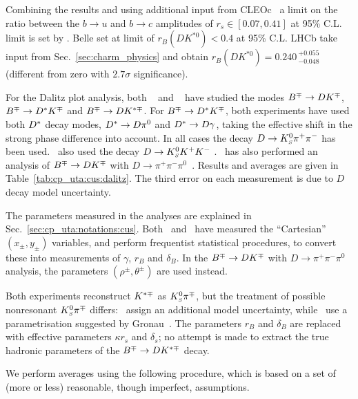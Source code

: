 

Combining the results and using additional input from
CLEOc~\cite{Asner:2008ft,Lowery:2009id} a limit on the ratio between the 
$b \to u$ and $b \to c$ amplitudes of $r_s \in \left[ 0.07,0.41 \right]$ 
at 95\% C.L. limit is set by \babar.
Belle set at limit of $r_B(DK^{*0}) < 0.4$ at 95\% C.L. 
LHCb take input from Sec.~\ref{sec:charm_physics} and obtain $r_B(DK^{*0}) = 0.240 \,^{+0.055}_{-0.048}$ (different from zero with $2.7\sigma$ significance). 

\label{sec:cp_uta:cus:dalitz}

For the Dalitz plot analysis, both 
\babar~\cite{Aubert:2008bd} and
\belle~\cite{Poluektov:2010wz,Poluektov:2006ia} have studied the modes 
$B^\mp \to DK^\mp$, $B^\mp \to D^*K^\mp$ and $B^\mp \to DK^{*\mp}$.
For $B^\mp \to D^*K^\mp$,
both experiments have used both $D^*$ decay modes, $D^* \to D\pi^0$ and
$D^* \to D\gamma$, taking the effective shift in the strong phase
difference into account. 
In all cases the decay $D \to K^0_{\scriptscriptstyle S}\pi^+\pi^-$ has been used.
\babar\ also used the decay $D \to K^0_{\scriptscriptstyle S} K^+K^-$ .
\babar\ has also performed an analysis of $B^\mp \to DK^\mp$ with 
$D \to \pi^+\pi^-\pi^0$~\cite{Aubert:2007ii}.
Results and averages are given in Table~\ref{tab:cp_uta:cus:dalitz}.
The third error on each measurement is due to $D$ decay model uncertainty.

The parameters measured in the analyses are explained in
Sec.~\ref{sec:cp_uta:notations:cus}.
Both \babar\ and \belle\ have measured the ``Cartesian''
$(x_\pm,y_\pm)$ variables,
and perform frequentist statistical procedures,
to convert these into measurements of $\gamma$, $r_B$ and $\delta_B$.
In the $B^\mp \to DK^\mp$ with $D \to \pi^+\pi^-\pi^0$ analysis,
the parameters $(\rho^{\pm}, \theta^\pm)$ are used instead.

Both experiments reconstruct $K^{*\mp}$ as $K^0_{\scriptscriptstyle S}\pi^\mp$,
but the treatment of possible nonresonant $K^0_{\scriptscriptstyle S}\pi^\mp$ differs:
\belle\ assign an additional model uncertainty,
while \babar\ use a parametrisation suggested by Gronau~\cite{Gronau:2002mu}.
The parameters $r_B$ and $\delta_B$ are replaced with 
effective parameters $\kappa r_s$ and $\delta_s$;
no attempt is made to extract the true hadronic parameters 
of the $B^\mp \to DK^{*\mp}$ decay.

We perform averages using the following procedure, which is based on a set of
(more or less) reasonable, though imperfect, assumptions. 

